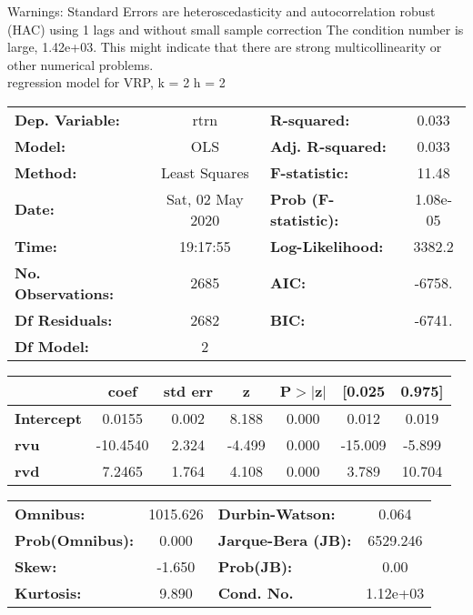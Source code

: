 Warnings: \newline
 [1] Standard Errors are heteroscedasticity and autocorrelation robust (HAC) using 1 lags and without small sample correction \newline
 [2] The condition number is large, 1.42e+03. This might indicate that there are \newline
 strong multicollinearity or other numerical problems.\\ 

regression model for VRP, k = 2 h = 2\begin{center}
\begin{tabular}{lclc}
\toprule
\textbf{Dep. Variable:}    &       rtrn       & \textbf{  R-squared:         } &     0.033   \\
\textbf{Model:}            &       OLS        & \textbf{  Adj. R-squared:    } &     0.033   \\
\textbf{Method:}           &  Least Squares   & \textbf{  F-statistic:       } &     11.48   \\
\textbf{Date:}             & Sat, 02 May 2020 & \textbf{  Prob (F-statistic):} &  1.08e-05   \\
\textbf{Time:}             &     19:17:55     & \textbf{  Log-Likelihood:    } &    3382.2   \\
\textbf{No. Observations:} &        2685      & \textbf{  AIC:               } &    -6758.   \\
\textbf{Df Residuals:}     &        2682      & \textbf{  BIC:               } &    -6741.   \\
\textbf{Df Model:}         &           2      & \textbf{                     } &             \\
\bottomrule
\end{tabular}
\begin{tabular}{lcccccc}
                   & \textbf{coef} & \textbf{std err} & \textbf{z} & \textbf{P$> |$z$|$} & \textbf{[0.025} & \textbf{0.975]}  \\
\midrule
\textbf{Intercept} &       0.0155  &        0.002     &     8.188  &         0.000        &        0.012    &        0.019     \\
\textbf{rvu}       &     -10.4540  &        2.324     &    -4.499  &         0.000        &      -15.009    &       -5.899     \\
\textbf{rvd}       &       7.2465  &        1.764     &     4.108  &         0.000        &        3.789    &       10.704     \\
\bottomrule
\end{tabular}
\begin{tabular}{lclc}
\textbf{Omnibus:}       & 1015.626 & \textbf{  Durbin-Watson:     } &    0.064  \\
\textbf{Prob(Omnibus):} &   0.000  & \textbf{  Jarque-Bera (JB):  } & 6529.246  \\
\textbf{Skew:}          &  -1.650  & \textbf{  Prob(JB):          } &     0.00  \\
\textbf{Kurtosis:}      &   9.890  & \textbf{  Cond. No.          } & 1.12e+03  \\
\bottomrule
\end{tabular}
\end{center}

